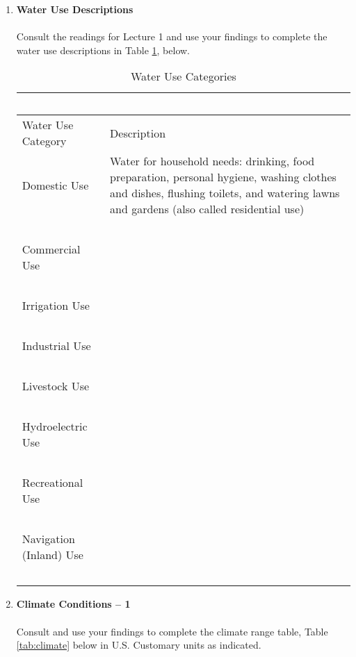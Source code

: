 \documentclass[12pt]{article}
\begin{document}
\begin{enumerate}
\item{{\textbf{Water Use Descriptions}}}~\\~\\
Consult the readings \citep{Chin2006,mays2011,Wurbs2002} for Lecture 1 and use your findings to complete the water use descriptions in Table \ref{tab:water-use}, below.
\begin{table}[htbp]
   \centering
   \caption{Water Use Categories}
   \begin{tabular}{p{1.7in}p{4.3in}} %
   ~ & ~ \\
\hline \hline
Water Use Category & Description \\
\hline
Domestic Use & Water for household needs: drinking, food preparation, personal hygiene, washing clothes and dishes, flushing toilets, and watering lawns and gardens (also called residential use) \\
   ~ & ~ \\
Commercial Use & ~\\
   ~ & ~ \\
Irrigation Use & ~\\
   ~ & ~ \\
Industrial Use & ~\\
   ~ & ~ \\
Livestock Use & ~\\
   ~ & ~ \\
Hydroelectric Use & ~\\
   ~ & ~ \\
Recreational Use & ~\\
   ~ & ~ \\
Navigation (Inland) Use & ~\\
   ~ & ~ \\
\hline
\hline
   \end{tabular}
   \label{tab:water-use}
\end{table}
\clearpage
\item{{\textbf{Climate Conditions -- 1}}}~\\~\\
Consult \cite{Chin2006} and use your findings to complete the climate range table, Table \ref{tab:climate} below in U.S. Customary units as indicated.


\end{enumerate}
\end{document}
